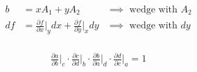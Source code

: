 \documentclass[a4paper, 11pt]{article}
\theoremstyle{definition}
\begin{document}
\begin{align*}
  b &= x A_1 + y A_2 & \text{$\implies$ wedge with $A_2$}\\
  df &= \frac{\partial f}{\partial x}\bigg\rvert_y dx
     + \frac{\partial f}{\partial y}\bigg\rvert_x dy& \text{$\implies$ wedge with $dy$}\\
\end{align*}

\newcommand{\pconst}[2]{\frac{\partial #1}{\partial #2}\bigg\rvert}

\begin{align*}
  \pconst{a}{b}_c \cdot \pconst{c}{d}_b \cdot \pconst{b}{a}_d \cdot \pconst{d}{c}_a = 1
\end{align*}



\end{document}
